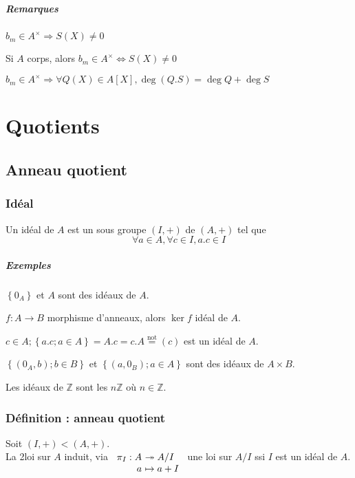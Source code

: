 \documentclass[reqno,a4paper,10pt]{report}
\makeatletter
\newcommand{\set}[1]{\left\lbrace #1 \right\rbrace} %
\newcommand{\IZ}{\ensuremath{\mathbb{Z}}\xspace} %
\newcommand{\so}{\Rightarrow}
\newcommand{\surj}{\twoheadrightarrow}
\let\olditemize=\itemize%
\renewenvironment{itemize}{%
    \olditemize%
  }{%
    \@noparlisttrue%
    \endlist%
  }%
\makeatother
\begin{document}
\paragraph{Remarques}
\begin{itemize}
  \item $b_m \in A^\times \so S(X) \neq 0$
  \item Si $A$ corps, alors $b_m \in A^\times \iff S(X)\neq 0$
  \item $b_m \in A^\times \so \forall Q(X) \in A[X], \deg(Q.S) = \deg Q + \deg
    S$
\end{itemize}

\chapter{Quotients}
\section{Anneau quotient}
\begin{comment}
  Détails, diagramme, 08/10/09 p1 verso.
\end{comment}
\subsection{Idéal}
Un idéal de $A$ est un sous groupe $(I,+)$ de $(A,+)$ tel que
\[\forall a \in A, \forall c\in I, a.c \in I\]
\paragraph{Exemples}
\begin{itemize}
  \item $\set{0_A}$ et $A$ sont des idéaux de $A$.
  \item $f:A\to B$ morphisme d'anneaux, alors $\ker f$ idéal de $A$.
  \item $c\in A; \set{a.c; a\in A} = A.c = c.A \overset{\text{not}}{=}(c)$ est
    un idéal de $A$.
  \item $\set{(0_A, b); b \in B}$ et $\set{(a,0_B); a \in A}$ sont des idéaux
    de $A\times B$.
  \item Les idéaux de $\IZ$ sont les $n\IZ$ où $n\in \IZ$.
\end{itemize}

\subsection{Définition : anneau quotient}
Soit $(I,+) < (A,+)$.\\
La 2\ieme loi sur $A$ induit, via $\begin{array}[t]{r@{\ }l}
  \pi_I : A &\surj A/I\\
  a &\mapsto a+I
\end{array}$ une loi sur $A/I$ ssi $I$ est
un idéal de $A$.
\end{document}
